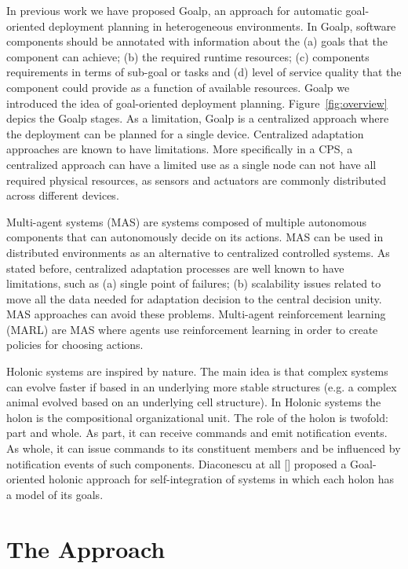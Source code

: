 \documentclass[conference]{IEEEtran}
\begin{document}
In previous work we have proposed Goalp, an approach for automatic goal-oriented deployment planning in heterogeneous environments. In Goalp, software components should be annotated with information about the (a) goals that the component can achieve; (b) the required runtime resources; (c) components requirements in terms of sub-goal or tasks and (d) level of service quality that the component could provide as a function of available resources.  
Goalp we introduced the idea of goal-oriented deployment planning. 
Figure~\ref{fig:overview} depics the Goalp stages.
 As a limitation, Goalp is a centralized approach where the deployment can be planned for a single device. Centralized adaptation approaches are known to have limitations. More specifically in a CPS, a centralized approach can have a limited use as a single node can not have all required physical resources, as sensors and actuators are commonly distributed across different devices. 


Multi-agent systems (MAS) are systems composed of multiple autonomous components that can autonomously decide on its actions. MAS can be used in distributed environments as an alternative to centralized controlled systems.
As stated before, centralized adaptation processes are well known to have limitations, such as (a) single point of failures;  (b) scalability issues related to move all the data needed for adaptation decision to the central decision unity. MAS approaches can avoid these problems. Multi-agent reinforcement learning (MARL) are MAS where agents use reinforcement learning in order to create policies for choosing actions.

Holonic systems are inspired by nature. The main idea is that complex systems can evolve faster if based in an underlying more stable structures (e.g. a complex animal evolved based on an underlying cell structure). In Holonic systems the holon is the compositional organizational unit. The role of the holon is twofold: part and whole. As part, it can receive commands and emit notification events. As whole, it can issue commands to its constituent members and be influenced by notification events of such components. Diaconescu at all [] proposed a Goal-oriented holonic approach for self-integration of systems in which each holon has a model of its goals.


\section{The Approach}
\end{document}
